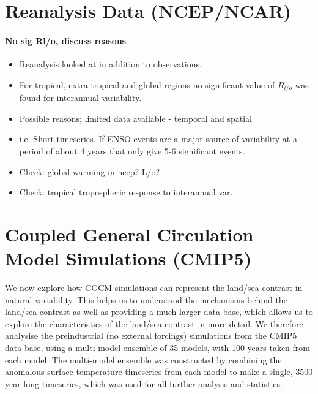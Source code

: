 
\pagebreak

\section{Reanalysis Data (NCEP/NCAR)}

\paragraph{No sig Rl/o, discuss reasons}
\begin{itemize}
	\item Reanalysis looked at in addition to observations.
	\item For tropical, extra-tropical and global regions no significant value 
		of $R_{l/o}$ was found for interannual variability.
	\item Possible reasons; limited data available - temporal and spatial
	\item i.e. Short timeseries. If ENSO events are a major source of 
		variability at a period of about 4 years that only give 5-6 significant 
		events.
	\item Check: global warming in ncep? L/o?
	\item Check: tropical tropospheric response to interannual var.
\end{itemize}



\section{Coupled General Circulation Model Simulations (CMIP5)}

We now explore how CGCM simulations can represent the land/sea contrast in 
natural variability. This helps us to understand the mechanisms behind the 
land/sea contrast as well as providing a much larger data base, which allows us 
to explore the characteristics of the land/sea contrast in more detail. We 
therefore analysise the preindustrial (no external forcings) simulations from 
the CMIP5 data base, using a multi model ensemble of 35 models, with 100 years 
taken from each model. The multi-model ensemble was constructed by combining the 
anomalous surface temperature timeseries from each model to make a single, 3500 
year long timeseries, which was used for all further analysis and statistics. 

